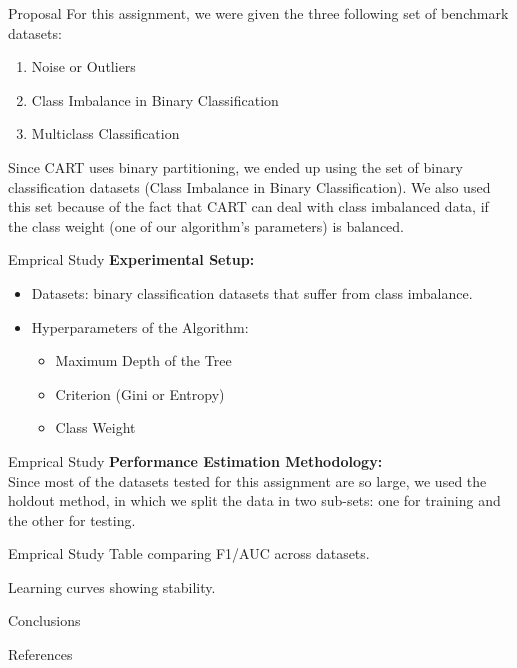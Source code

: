 \documentclass{beamer}
\begin{document}
\begin{frame}{Proposal}
For this assignment, we were given the three following set 
    of benchmark datasets:
    \begin{enumerate}
       \item Noise or Outliers 
       \item Class Imbalance in Binary Classification
       \item Multiclass Classification 
    \end{enumerate}
    Since CART uses binary partitioning, we ended up using the 
    set of binary classification datasets 
    (Class Imbalance in Binary Classification). We also used this 
    set because of the fact that CART can deal with class 
    imbalanced data, if the class weight (one of our algorithm's 
    parameters) is balanced. 
\end{frame}      

\begin{frame}{Emprical Study}
    \textbf{Experimental Setup:} 
    \begin{itemize} 
        \item Datasets: binary classification datasets that 
        suffer from class imbalance. 
        \item Hyperparameters of the Algorithm:
        \begin{itemize}
            \item Maximum Depth of the Tree 
            \item Criterion (Gini or Entropy)
            \item Class Weight 
        \end{itemize}
    \end{itemize}
\end{frame}

\begin{frame}{Emprical Study}
    \textbf{Performance Estimation Methodology:} \\ Since most 
    of the datasets tested for this assignment are so large, we used
    the holdout method, in which we split the data in two 
    sub-sets: one for training and the other for testing. 
\end{frame}

\begin{frame}{Emprical Study}
    Table comparing F1/AUC across datasets.

   Learning curves showing stability.
   
\end{frame}

\begin{frame}{Conclusions}
\end{frame}

\begin{frame}{References}
\end{frame}
\end{document}
